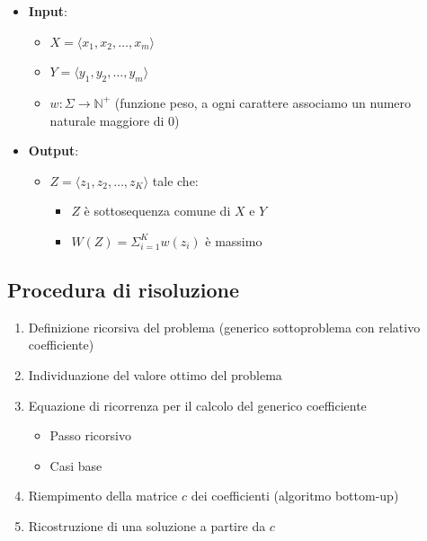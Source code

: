\begin{itemize}
    \item \textbf{Input}:
    \begin{itemize}
        \item $X = \langle x_1, x_2, \dots, x_m \rangle$
        \item $Y = \langle y_1, y_2, \dots, y_m \rangle$
        \item $w: \Sigma \to \mathbb{N}^+$ (funzione peso, a ogni carattere associamo un numero naturale maggiore di 0)
    \end{itemize}

    \item \textbf{Output}:
    \begin{itemize}
        \item $Z = \langle z_1, z_2, \dots, z_K\rangle$ tale che:
        \begin{itemize}
            \item $Z$ è sottosequenza comune di $X$ e $Y$
            \item $W(Z) = \Sigma_{i=1}^K w(z_i)$ è massimo
        \end{itemize}
    \end{itemize}
\end{itemize}

\subsection{Procedura di risoluzione}
\begin{enumerate}
    \item Definizione ricorsiva del problema (generico sottoproblema con relativo coefficiente)
    \item Individuazione del valore ottimo del problema
    \item Equazione di ricorrenza per il calcolo del generico coefficiente
    \begin{itemize}
        \item Passo ricorsivo
        \item Casi base
    \end{itemize}
    \item Riempimento della matrice $c$ dei coefficienti (algoritmo bottom-up)
    \item Ricostruzione di una soluzione a partire da $c$
\end{enumerate}

